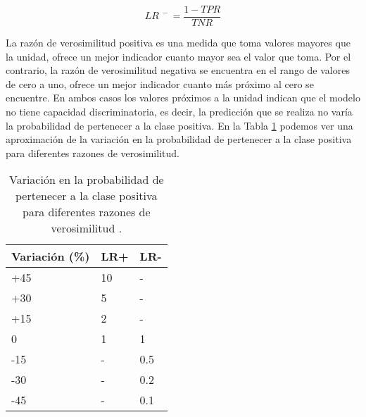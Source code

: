 \bigbreak

\begin{equation}
    LR^{\phantom{.}-} = \frac{1-TPR}{TNR}
    \label{eq:LR-}
\end{equation}

\bigbreak

La razón de verosimilitud positiva es una medida que toma valores mayores que la unidad, ofrece un mejor indicador cuanto mayor sea el valor que toma. Por el contrario, la razón de verosimilitud negativa se encuentra en el rango de valores de cero a uno, ofrece un mejor indicador cuanto más próximo al cero se encuentre. En ambos casos los valores próximos a la unidad indican que el modelo no tiene capacidad discriminatoria, es decir, la predicción que se realiza no varía la probabilidad de pertenecer a la clase positiva. En la Tabla \ref{tab:2} podemos ver una aproximación de la variación en la probabilidad de pertenecer a la clase positiva para diferentes razones de verosimilitud.

\bigbreak

\begin{table}[htp]
    \small
    \centering
    \begin{tabular}{l l l}
        Variación (\%) & \hspace{10pt}LR+ & \hspace{10pt}LR- \\\hline
        +45            & \hspace{10pt}10  & \hspace{10pt}-   \\\hline
        +30            & \hspace{10pt}5   & \hspace{10pt}-   \\\hline
        +15            & \hspace{10pt}2   & \hspace{10pt}-   \\\hline
        0              & \hspace{10pt}1   & \hspace{10pt}1   \\\hline
        -15            & \hspace{10pt}-   & \hspace{10pt}0.5 \\\hline
        -30            & \hspace{10pt}-   & \hspace{10pt}0.2 \\\hline
        -45            & \hspace{10pt}-   & \hspace{10pt}0.1 \\\hline
    \end{tabular}

    \caption{Variación en la probabilidad de pertenecer a la clase positiva para diferentes razones de verosimilitud \cite{McGee2002}.}
    \label{tab:2}
\end{table}

